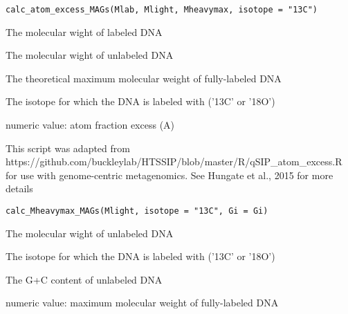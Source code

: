 \documentclass[a4paper]{book}
\begin{document}
%
\begin{Usage}
\begin{verbatim}
calc_atom_excess_MAGs(Mlab, Mlight, Mheavymax, isotope = "13C")
\end{verbatim}
\end{Usage}
%
\begin{Arguments}
\begin{ldescription}
\item[\code{Mlab}] The molecular wight of labeled DNA

\item[\code{Mlight}] The molecular wight of unlabeled DNA

\item[\code{Mheavymax}] The theoretical maximum molecular weight of fully-labeled DNA

\item[\code{isotope}] The isotope for which the DNA is labeled with ('13C' or '18O')
\end{ldescription}
\end{Arguments}
%
\begin{Value}
numeric value: atom fraction excess (A)
\end{Value}
%
\begin{Description}\relax
This script was adapted from https://github.com/buckleylab/HTSSIP/blob/master/R/qSIP\_atom\_excess.R
for use with genome-centric metagenomics. See Hungate et al., 2015 for more details
\end{Description}
%
\begin{Usage}
\begin{verbatim}
calc_Mheavymax_MAGs(Mlight, isotope = "13C", Gi = Gi)
\end{verbatim}
\end{Usage}
%
\begin{Arguments}
\begin{ldescription}
\item[\code{Mlight}] The molecular wight of unlabeled DNA

\item[\code{isotope}] The isotope for which the DNA is labeled with ('13C' or '18O')

\item[\code{Gi}] The G+C content of unlabeled DNA
\end{ldescription}
\end{Arguments}
%
\begin{Value}
numeric value: maximum molecular weight of fully-labeled DNA
\end{Value}
\end{document}
